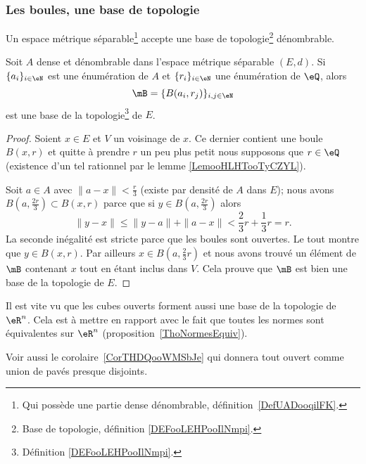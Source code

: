 \subsubsection{Les boules, une base de topologie}

\begin{proposition} \label{PropNBSooraAFr}
	Un espace métrique séparable\footnote{Qui possède une partie dense dénombrable, définition~\ref{DefUADooqilFK}.} accepte une base de topologie\footnote{Base de topologie, définition \ref{DEFooLEHPooIlNmpi}.} dénombrable.

	Soit \( A\) dense et dénombrable dans l'espace métrique séparable \( (E,d)\). Si \( \{ a_i \}_{i\in \eN}\) est une énumération de \( A\) et \( \{ r_i \}_{i\in \eN}\) une énumération de \( \eQ\), alors
	\begin{equation}
		\mB=\{ B(a_i,r_j) \}_{i,j\in \eN}
	\end{equation}
	est une base de la topologie\footnote{Définition \ref{DEFooLEHPooIlNmpi}.} de \( E\).
\end{proposition}

\begin{proof}
	Soient \( x\in E\) et \( V\) un voisinage de \( x\). Ce dernier contient une boule \( B(x,r)\) et quitte à prendre \( r\) un peu plus petit nous supposons que \( r\in \eQ\) (existence d'un tel rationnel par le lemme \ref{LemooHLHTooTyCZYL}).

	Soit \( a\in A\) avec \( \| a-x \|<\frac{ r }{ 3 }\) (existe par densité de \( A\) dans \( E\)); nous avons \( B(a,\frac{ 2r }{ 3 })\subset B(x,r)\) parce que si \( y\in B( a,\frac{ 2r }{ 3 } )\) alors
	\begin{equation}
		\| y-x \|\leq \| y-a \|+\| a-x \|<\frac{ 2 }{ 3 }r+\frac{ 1 }{ 3 }r=r.
	\end{equation}
	La seconde inégalité est stricte parce que les boules sont ouvertes. Le tout montre que \( y\in B(x,r)\). Par ailleurs \( x\in B(a,\frac{ 2 }{ 3 }r)\) et nous avons trouvé un élément de \( \mB\) contenant \( x\) tout en étant inclus dans \( V\). Cela prouve que \( \mB\) est bien une base de la topologie de \( E\).
\end{proof}


\begin{remark}      \label{RemIPVLooHUXyeW}
	Il est vite vu que les cubes ouverts forment aussi une base de la topologie de \( \eR^n\). Cela est à mettre en rapport avec le fait que toutes les normes sont équivalentes sur \( \eR^n\) (proposition~\ref{ThoNormesEquiv}).


	Voir aussi le corolaire~\ref{CorTHDQooWMSbJe} qui donnera tout ouvert comme union de pavés presque disjoints.
\end{remark}

